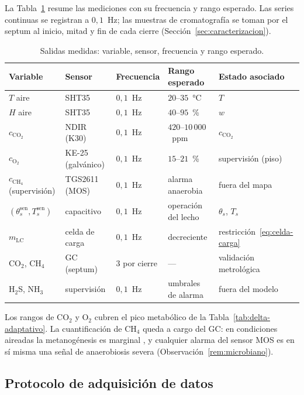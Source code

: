 La Tabla~\ref{tab:salidas} resume las mediciones con su frecuencia y rango
esperado. Las series continuas se registran a $0{,}1$~Hz; las muestras de
cromatografía se toman por el septum al inicio, mitad y fin de cada cierre
(Sección~\ref{sec:caracterizacion}).

\begin{table}[htbp]
  \centering
  \caption{Salidas medidas: variable, sensor, frecuencia y rango esperado.}
  \label{tab:salidas}
  \begin{tabular}{lllll}
    \hline
    Variable & Sensor & Frecuencia & Rango esperado & Estado asociado \\
    \hline
    $T$ aire & SHT35 & $0{,}1$~Hz & $20$--$35$~°C & $T$ \\
    $H$ aire & SHT35 & $0{,}1$~Hz & $40$--$95$~\% & $w$ \\
    $c_{\mathrm{CO_2}}$ & NDIR (K30) & $0{,}1$~Hz & $420$--$10\,000$~ppm & $c_{\mathrm{CO_2}}$ \\
    $c_{\mathrm{O_2}}$ & KE-25 (galvánico) & $0{,}1$~Hz & $15$--$21$~\% & supervisión (piso) \\
    $c_{\mathrm{CH_4}}$ (supervisión) & TGS2611 (MOS) & $0{,}1$~Hz & alarma anaerobia & fuera del mapa \\
    $(\theta_s^{\mathrm{sen}}, T_s^{\mathrm{sen}})$ & capacitivo & $0{,}1$~Hz & operación del lecho & $\theta_s$, $T_s$ \\
    $m_{\mathrm{LC}}$ & celda de carga & $0{,}1$~Hz & decreciente & restricción~\eqref{eq:celda-carga} \\
    CO$_2$, CH$_4$ & GC (septum) & $3$ por cierre & --- & validación metrológica \\
    H$_2$S, NH$_3$ & supervisión & $0{,}1$~Hz & umbrales de alarma & fuera del modelo \\
    \hline
  \end{tabular}
\end{table}

Los rangos de CO$_2$ y O$_2$ cubren el pico metabólico de la
Tabla~\ref{tab:delta-adaptativo}. La cuantificación de CH$_4$ queda a cargo
del GC: en condiciones aireadas la metanogénesis es marginal
\citep{rossiEstimatingDynamicsGreenhouse2024a}, y cualquier alarma del
sensor MOS es en sí misma una señal de anaerobiosis severa
(Observación~\ref{rem:microbiano}).

\subsection{Protocolo de adquisición de datos}\label{sec:adquisicion}

